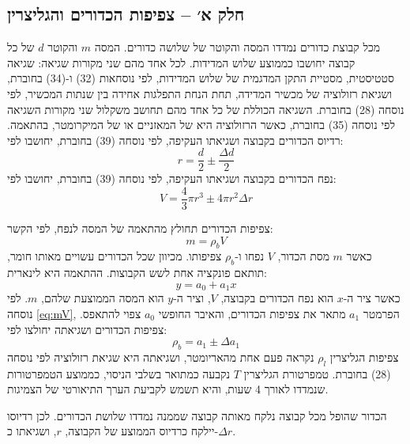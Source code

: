 \documentclass[10pt,a4paper]{article}
\begin{document}
\subsection*{חלק א׳ -- צפיפות הכדורים והגליצרין}
מכל קבוצת כדורים נמדדו המסה והקוטר של שלושה כדורים. המסה $m$ והקוטר $d$ של כל קבוצה יחושבו כממוצע שלוש המדידות. לכל אחד מהם שני מקורות שגיאה: שגיאה סטטיסטית, מסטיית התקן המדגמית של שלוש המדידות, לפי נוסחאות (32) ו-(34) בחוברת, ושגיאת רזולוציה של מכשיר המדידה, תחת הנחת התפלגות אחידה בין שנתות המכשיר, לפי נוסחה (28) בחוברת. השגיאה הכוללת של כל אחד מהם תחושב משקלול שני מקורות השגיאה לפי נוסחה (35) בחוברת, כאשר הרזולוציה היא של המאזניים או של המיקרומטר, בהתאמה. רדיוס הכדורים בקבוצה ושגיאתו העקיפה, לפי נוסחה (39) בחוברת, יחושבו לפי:
\begin{equation}\label{eq:rbar}
r = \frac{d}{2} \pm \frac{\Delta d}{2}
\end{equation}
נפח הכדורים בקבוצה ושגיאתו העקיפה, לפי נוסחה (39) בחוברת, יחושבו לפי:
\begin{equation}\label{eq:V}
V = \frac{4}{3}\pi r^3 \pm 4\pi r^2 \Delta r
\end{equation}

צפיפות הכדורים תחולץ מהתאמה של המסה לנפח, לפי הקשר:
\begin{equation}\label{eq:mV}
m = \rho_b V
\end{equation}
כאשר $m$ מסת הכדור, $V$ נפחו ו-$\rho_b$ צפיפותו. מכיוון שכל הכדורים עשויים מאותו חומר, תותאם פונקציה אחת לשש הקבוצות. ההתאמה היא לינארית:
\begin{equation}\label{eq:linfit}
y = a_0 + a_1 x
\end{equation}
כאשר ציר ה-$x$ הוא נפח הכדורים בקבוצה, $V$, וציר ה-$y$ הוא המסה הממוצעת שלהם, $m$. לפי נוסחה \eqref{eq:mV}, הפרמטר $a_1$ מתאר את צפיפות הכדורים, והאיבר החופשי $a_0$ צפוי להתאפס. צפיפות הכדורים ושגיאתה יחולצו לפי:
\begin{equation}\label{eq:rhob}
\rho_b = a_1 \pm \Delta a_1
\end{equation}
צפיפות הגליצרין $\rho_l$ נקראה פעם אחת מהאריומטר, ושגיאתה היא שגיאת רזולוציה לפי נוסחה (28) בחוברת. טמפרטורת הגליצרין $T$ נקבעה כמתואר בשלבי הניסוי, כממוצע הטמפרטורות שנמדדו לאורך 4 שעות, והיא תשמש לקביעת הערך התיאורטי של הצמיגות.

הכדור שהופל מכל קבוצה נלקח מאותה קבוצה שממנה נמדדו שלושת הכדורים. לכן רדיוסו יילקח כרדיוס הממוצע של הקבוצה, $r$, ושגיאתו כ-$\Delta r$.
\end{document}
